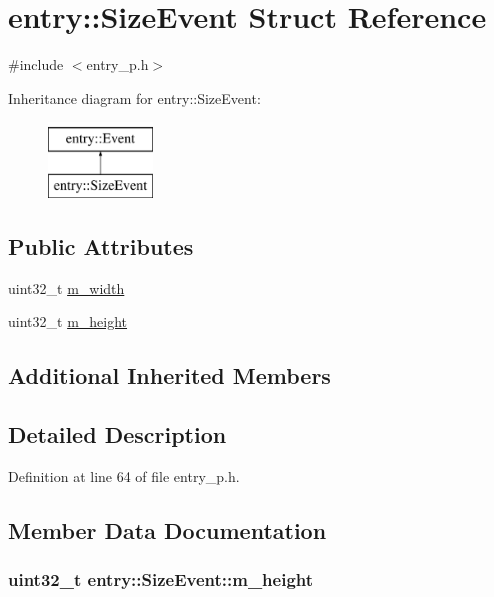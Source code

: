 \hypertarget{structentry_1_1_size_event}{\section{entry\+:\+:Size\+Event Struct Reference}
\label{structentry_1_1_size_event}
}


{\ttfamily \#include $<$entry\+\_\+p.\+h$>$}

Inheritance diagram for entry\+:\+:Size\+Event\+:\begin{figure}[H]
\begin{center}
\leavevmode
\includegraphics[height=2.000000cm]{structentry_1_1_size_event}
\end{center}
\end{figure}
\subsection*{Public Attributes}
\begin{DoxyCompactItemize}
\item 
uint32\+\_\+t \hyperlink{structentry_1_1_size_event_a57acae9e73a5e52d05c4b8f4099e8ecb}{m\+\_\+width}
\item 
uint32\+\_\+t \hyperlink{structentry_1_1_size_event_a5997cbf5a42df94dd72eb06bde7b6032}{m\+\_\+height}
\end{DoxyCompactItemize}
\subsection*{Additional Inherited Members}


\subsection{Detailed Description}


Definition at line 64 of file entry\+\_\+p.\+h.



\subsection{Member Data Documentation}
\hypertarget{structentry_1_1_size_event_a5997cbf5a42df94dd72eb06bde7b6032}{
\subsubsection[{m\+\_\+height}]{\setlength{\rightskip}{0pt plus 5cm}uint32\+\_\+t entry\+::\+Size\+Event\+::m\+\_\+height}}\label{structentry_1_1_size_event_a5997cbf5a42df94dd72eb06bde7b6032}


